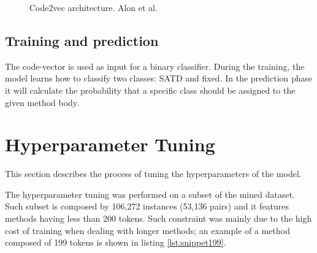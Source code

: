 \begin{figure}
 \centering
 \caption[]{Code2vec architecture. Alon et al. \cite{alon2019code2vec}}
    \label{fig:code2vec_arch}
\end{figure}
 

\subsection{Training and prediction}




The code-vector is used as input for a binary classifier. During the training, the model learns how to classify two classes: SATD and fixed. 
In the prediction phase it will calculate the probability that a specific class should be assigned to the given method body. 

\section{Hyperparameter Tuning}

This section describes the process of tuning the hyperparameters of the model.

The hyperparameter tuning was performed on a subset of the mined dataset. Such subset is composed by 106,272 instances (53,136 pairs) and it features methods having less than 200 tokens. Such constraint was mainly due to the high cost of training when dealing with longer methods; an example of a method composed of 199 tokens is shown in listing \ref{lst:snippet199}.

